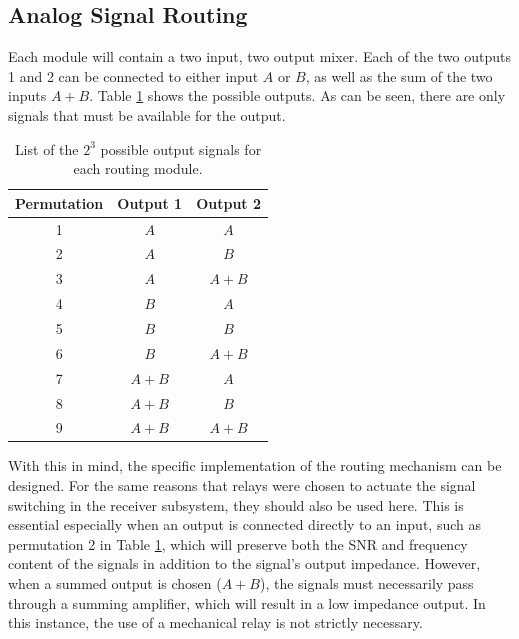 \documentclass{article}
\begin{document}
	\color{gray}

	\subsection{Analog Signal Routing}

	Each module will contain a two input, two output mixer.  Each of the two outputs 1 and 2 can be connected to either input $A$ or $B$, as well as the sum of the two inputs $A + B$.  Table \ref{tab:routing_outputs} shows the possible outputs.  As can be seen, there are only signals that must be available for the output.

	\begin{table}
	\begin{center}
	\begin{tabular}{ |c|c c| }
	\hline
	 Permutation & Output 1 & Output 2 \\ 
	 \hline
	 1 	& $A$ 	& $A$ \\  
	 2 	& $A$ 	& $B$ \\
	 3	& $A$ 	& $A+B$ \\
	 4	& $B$ 	& $A$ \\
	 5	& $B$ 	& $B$ \\
	 6	& $B$ 	& $A+B$ \\
	 7	& $A+B$ & $A$ \\
	 8	& $A+B$ & $B$ \\
	 9	& $A+B$ & $A+B$ \\
	 \hline
	\end{tabular}
	\caption{List of the $2^3$ possible output signals for each routing module.}
	\label{tab:routing_outputs}
	\end{center}
	\end{table}

	With this in mind, the specific implementation of the routing mechanism can be designed.  For the same reasons that relays were chosen to actuate the signal switching in the receiver subsystem, they should also be used here.  This is essential especially when an output is connected directly to an input, such as permutation 2 in Table \ref{tab:routing_outputs}, which will preserve both the SNR and frequency content of the signals in addition to the signal's output impedance.  However, when a summed output is chosen ($A+B$), the signals must necessarily pass through a summing amplifier, which will result in a low impedance output.  In this instance, the use of a mechanical relay is not strictly necessary.
\end{document}
